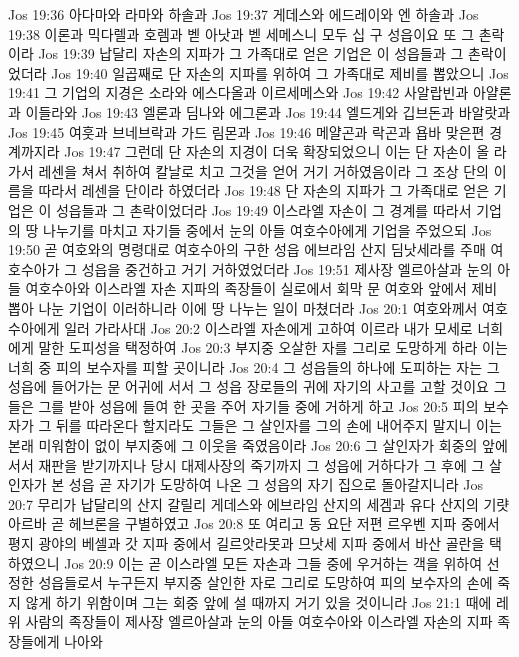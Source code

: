 Jos 19:36  아다마와 라마와 하솔과
Jos 19:37  게데스와 에드레이와 엔 하솔과
Jos 19:38  이론과 믹다렐과 호렘과 벧 아낫과 벧 세메스니 모두 십 구 성읍이요 또 그 촌락이라
Jos 19:39  납달리 자손의 지파가 그 가족대로 얻은 기업은 이 성읍들과 그 촌락이었더라
Jos 19:40  일곱째로 단 자손의 지파를 위하여 그 가족대로 제비를 뽑았으니
Jos 19:41  그 기업의 지경은 소라와 에스다올과 이르세메스와
Jos 19:42  사알랍빈과 아얄론과 이들라와
Jos 19:43  엘론과 딤나와 에그론과
Jos 19:44  엘드게와 깁브돈과 바알랏과
Jos 19:45  여훗과 브네브락과 가드 림몬과
Jos 19:46  메얄곤과 락곤과 욥바 맞은편 경계까지라
Jos 19:47  그런데 단 자손의 지경이 더욱 확장되었으니 이는 단 자손이 올 라가서 레센을 쳐서 취하여 칼날로 치고 그것을 얻어 거기 거하였음이라 그 조상 단의 이름을 따라서 레센을 단이라 하였더라
Jos 19:48  단 자손의 지파가 그 가족대로 얻은 기업은 이 성읍들과 그 촌락이었더라
Jos 19:49  이스라엘 자손이 그 경계를 따라서 기업의 땅 나누기를 마치고 자기들 중에서 눈의 아들 여호수아에게 기업을 주었으되
Jos 19:50  곧 여호와의 명령대로 여호수아의 구한 성읍 에브라임 산지 딤낫세라를 주매 여호수아가 그 성읍을 중건하고 거기 거하였었더라
Jos 19:51  제사장 엘르아살과 눈의 아들 여호수아와 이스라엘 자손 지파의 족장들이 실로에서 회막 문 여호와 앞에서 제비 뽑아 나눈 기업이 이러하니라 이에 땅 나누는 일이 마쳤더라
Jos 20:1  여호와께서 여호수아에게 일러 가라사대
Jos 20:2  이스라엘 자손에게 고하여 이르라 내가 모세로 너희에게 말한 도피성을 택정하여
Jos 20:3  부지중 오살한 자를 그리로 도망하게 하라 이는 너희 중 피의 보수자를 피할 곳이니라
Jos 20:4  그 성읍들의 하나에 도피하는 자는 그 성읍에 들어가는 문 어귀에 서서 그 성읍 장로들의 귀에 자기의 사고를 고할 것이요 그들은 그를 받아 성읍에 들여 한 곳을 주어 자기들 중에 거하게 하고
Jos 20:5  피의 보수자가 그 뒤를 따라온다 할지라도 그들은 그 살인자를 그의 손에 내어주지 말지니 이는 본래 미워함이 없이 부지중에 그 이웃을 죽였음이라
Jos 20:6  그 살인자가 회중의 앞에 서서 재판을 받기까지나 당시 대제사장의 죽기까지 그 성읍에 거하다가 그 후에 그 살인자가 본 성읍 곧 자기가 도망하여 나온 그 성읍의 자기 집으로 돌아갈지니라
Jos 20:7  무리가 납달리의 산지 갈릴리 게데스와 에브라임 산지의 세겜과 유다 산지의 기럇 아르바 곧 헤브론을 구별하였고
Jos 20:8  또 여리고 동 요단 저편 르우벤 지파 중에서 평지 광야의 베셀과 갓 지파 중에서 길르앗라못과 므낫세 지파 중에서 바산 골란을 택하였으니
Jos 20:9  이는 곧 이스라엘 모든 자손과 그들 중에 우거하는 객을 위하여 선정한 성읍들로서 누구든지 부지중 살인한 자로 그리로 도망하여 피의 보수자의 손에 죽지 않게 하기 위함이며 그는 회중 앞에 설 때까지 거기 있을 것이니라
Jos 21:1  때에 레위 사람의 족장들이 제사장 엘르아살과 눈의 아들 여호수아와 이스라엘 자손의 지파 족장들에게 나아와

